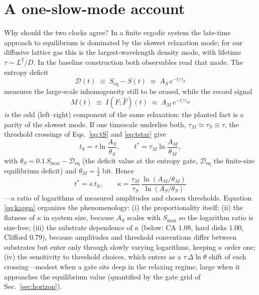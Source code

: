 \documentclass[aps,pre,twocolumn,superscriptaddress,nofootinbib,longbibliography]{revtex4-2}
\newcommand{\tS}{t_{\mathrm{S}}}
\newcommand{\tstar}{t^{*}}
\newcommand{\Smax}{S_{\max}}
\newcommand{\kap}{\kappa}
\begin{document}
\section{A one-slow-mode account}
\label{sec:mechanism}

Why should the two clocks agree? In a finite ergodic system the late-time approach to
equilibrium is dominated by the slowest relaxation mode; for our diffusive lattice gas this
is the largest-wavelength density mode, with lifetime $\tau\sim L^2/D$. In the baseline
construction both observables read that mode. The entropy deficit
\begin{equation}
\mathcal D(t) \;\equiv\; S_{\mathrm{eq}}-S(t) \;\approx\; A_S\,e^{-t/\tau_S}
\end{equation}
measures the large-scale inhomogeneity still to be erased, while the record signal
\begin{equation}
M(t)\;\equiv\;I\!\left(F;\hat F\right)(t) \;\approx\; A_M\,e^{-t/\tau_M}
\end{equation}
\emph{is} the odd (left--right) component of the same relaxation: the planted fact is a
parity of the slowest mode. If one timescale underlies both,
$\tau_M\simeq\tau_S\equiv\tau$, the threshold crossings of Eqs.~\eqref{eq:tS} and
\eqref{eq:tstar} give
\begin{equation}
\tS=\tau\ln\!\frac{A_S}{\theta_S},\qquad
\tstar=\tau_M\ln\!\frac{A_M}{\theta_M},
\end{equation}
with $\theta_S=0.1\,\Smax-\mathcal D_{\mathrm{eq}}$ (the deficit value at the entropy gate,
$\mathcal D_{\mathrm{eq}}$ the finite-size equilibrium deficit) and $\theta_M=\tfrac12$ bit.
Hence
\begin{equation}
\boxed{\;\tstar=\kap\,\tS,\qquad
\kap=\frac{\tau_M}{\tau_S}\,
\frac{\ln(A_M/\theta_M)}{\ln(A_S/\theta_S)}\;}
\label{eq:kappa}
\end{equation}
---a ratio of logarithms of measured amplitudes and chosen thresholds. Equation
\eqref{eq:kappa} organizes the phenomenology: (i) the proportionality itself; (ii) the
flatness of $\kap$ in system size, because $A_S$ scales with $\Smax$ so the logarithm ratio
is size-free; (iii) the substrate dependence of $\kap$ (below: CA $1.08$, hard disks
$1.00$, Clifford $0.79$), because amplitudes and threshold conventions differ between
substrates but enter only through slowly varying logarithms, keeping $\kap$ order one;
(iv) the sensitivity to threshold choices, which enters as a $\tau\,\Delta\ln\theta$
shift of each crossing---modest when a gate sits deep in the relaxing regime, large when it
approaches the equilibrium value (quantified by the gate grid of Sec.~\ref{sec:horizon}).
\end{document}
